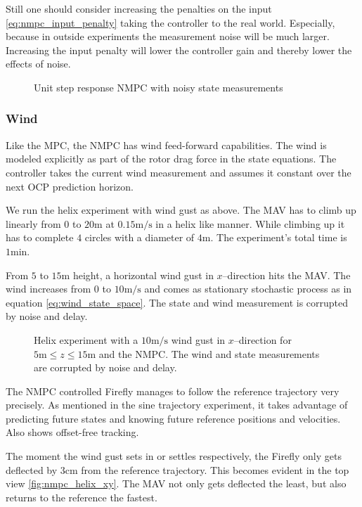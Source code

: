 Still one should consider increasing the penalties on the input \ref{eq:nmpc_input_penalty} taking the controller to the real world. Especially, because in outside experiments the measurement noise will be much larger. Increasing the input penalty will lower the controller gain and thereby lower the effects of noise.

\begin{figure}
\centering
{}
\qquad
{}
\caption{Unit step response NMPC with noisy state measurements}
\label{fig:nmpc_step_noisy}
\end{figure}


\subsubsection{Wind}
Like the MPC, the NMPC has wind feed-forward capabilities. The wind is modeled explicitly as part of the rotor drag force in the state equations. The controller takes the current wind measurement and assumes it constant over the next OCP prediction horizon.

We run the helix experiment with wind gust as above. The MAV has to climb up linearly from $0$ to $20 \si{\metre}$ at $0.15 \si{\metre\per\second}$ in a helix like manner. While climbing up it has to complete $4$ circles with a diameter of $4\si{\metre}$. The experiment's total time is $1 \si{\minute}$. 

From $5$ to $15 \si{\metre}$ height, a horizontal wind gust in $x$--direction hits the MAV. The wind increases from $0$ to $10 \si{\metre\per\second}$ and comes as stationary stochastic process as in equation \ref{eq:wind_state_space}. The state and wind measurement is corrupted by noise and delay.

\begin{figure}
\centering
{}
\qquad
{}
\caption{Helix experiment with a $10 \si{\metre\per\second}$ wind gust in $x$--direction for $5 \si{\metre} \leq z \leq 15 \si{\metre}$ and the NMPC. The wind and state measurements are corrupted by noise and delay.}
\label{fig:nmpc_helix}
\end{figure}

The NMPC controlled Firefly manages to follow the reference trajectory very precisely. As mentioned in the sine trajectory experiment, it takes advantage of predicting future states and knowing future reference positions and velocities. Also shows offset-free tracking.

The moment the wind gust sets in or settles respectively, the Firefly only gets deflected by $3\si{\centi\metre}$ from the reference trajectory. This becomes evident in the top view \ref{fig:nmpc_helix_xy}. The MAV not only gets deflected the least, but also returns to the reference the fastest.%